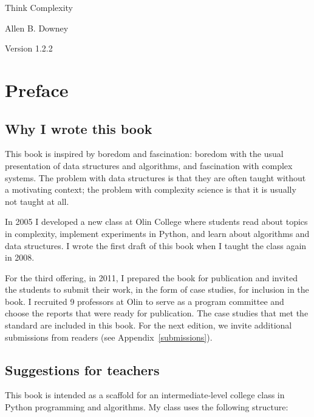 \documentclass[10pt]{book}
\newcommand{\thetitle}{Think Complexity}
\newcommand{\theversion}{1.2.2}
\begin{document}

\begin{htmlonly}


{\Large \thetitle}

{\large Allen B. Downey}

Version \theversion

\setcounter{chapter}{-1}

\end{htmlonly}

\fi

\chapter{Preface}

\section{Why I wrote this book}

This book is inspired by boredom and fascination: boredom with the
usual presentation of data structures and algorithms, and
fascination with complex systems.  The problem with data structures
is that they are often taught without a motivating context; the
problem with complexity science is that it is usually not taught at
all.

In 2005 I developed a new class at Olin College where students read
about topics in complexity, implement experiments in Python, and learn
about algorithms and data structures.  I wrote the first draft of this
book when I taught the class again in 2008.

For the third offering, in 2011, I prepared the book for publication
and invited the students to submit their work, in the form of case
studies, for inclusion in the book.  I recruited 9 professors at Olin
to serve as a program committee and choose the reports that were ready
for publication.  The case studies that met the standard are included
in this book.  For the next edition, we invite additional submissions
from readers (see Appendix~\ref{submissions}).

\section{Suggestions for teachers}

This book is intended as a scaffold for an intermediate-level college
class in Python programming and algorithms.  My class uses the following
structure:
\end{document}
